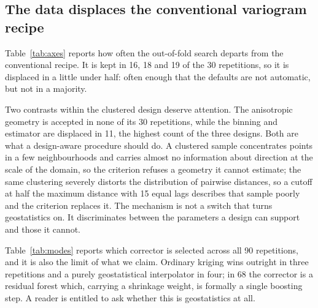 \documentclass[preprint,12pt,authoryear]{elsarticle}
\begin{document}
\subsection{The data displaces the conventional variogram recipe}

Table~\ref{tab:axes} reports how often the out-of-fold search departs from the
conventional recipe. It is kept in 16, 18 and 19 of the 30 repetitions, so it is
displaced in a little under half: often enough that the defaults are not
automatic, but not in a majority.

\begin{table}[!ht]
\centering
\caption{Repetitions, out of 30 per design, in which the out-of-fold search departs from the conventional recipe: an exponential family, a cutoff at half the maximum distance, 15 lags, the robust estimator, a bandwidth of half the practical range, and isotropy.}
\label{tab:axes}
\small
\setlength{\tabcolsep}{3pt}

\end{table}

Two contrasts within the clustered design deserve attention. The anisotropic
geometry is accepted in none of its 30 repetitions, while the binning and
estimator are displaced in 11, the highest count of the three designs. Both are
what a design-aware procedure should do. A clustered sample concentrates points
in a few neighbourhoods and carries almost no information about direction at the
scale of the domain, so the criterion refuses a geometry it cannot estimate; the
same clustering severely distorts the distribution of pairwise distances, so a
cutoff at half the maximum distance with 15 equal lags describes that sample
poorly and the criterion replaces it. The mechanism is not a switch that turns
geostatistics on. It discriminates between the parameters a design can support
and those it cannot.

Table~\ref{tab:modes} reports which corrector is selected across all 90
repetitions, and it is also the limit of what we claim. Ordinary kriging wins
outright in three repetitions and a purely geostatistical interpolator in four;
in 68 the corrector is a residual forest which, carrying a shrinkage weight, is
formally a single boosting step. A reader is entitled to ask whether this is
geostatistics at all.

\begin{table}[!ht]
\centering
\caption{Selected corrector across all 90 repetitions.}
\label{tab:modes}
\small

\end{table}
\end{document}
